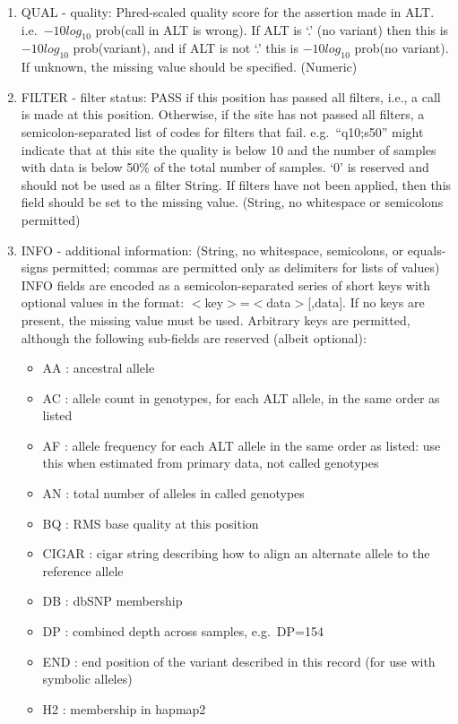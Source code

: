 \documentclass[8pt]{article}
\begin{document}
\begin{enumerate}
  \item QUAL - quality: Phred-scaled quality score for the assertion made in ALT. i.e.\ $-10log_{10}$ prob(call in ALT is wrong). If ALT is `.' (no variant) then this is $-10log_{10}$ prob(variant), and if ALT is not `.' this is $-10log_{10}$ prob(no variant). If unknown, the missing value should be specified. (Numeric)
  \item FILTER - filter status: PASS if this position has passed all filters, i.e., a call is made at this position. Otherwise, if the site has not passed all filters, a semicolon-separated list of codes for filters that fail. e.g.\ ``q10;s50'' might indicate that at this site the quality is below 10 and the number of samples with data is below 50\% of the total number of samples. `0' is reserved and should not be used as a filter String. If filters have not been applied, then this field should be set to the missing value. (String, no whitespace or semicolons permitted)
  \item INFO - additional information: (String, no whitespace, semicolons, or equals-signs permitted; commas are permitted only as delimiters for lists of values) INFO fields are encoded as a semicolon-separated series of short keys with optional values in the format: $<$key$>$=$<$data$>$[,data]. If no keys are present, the missing value must be used. Arbitrary keys are permitted, although the following sub-fields are reserved (albeit optional):
\begin{itemize}
  \item AA : ancestral allele
  \item AC : allele count in genotypes, for each ALT allele, in the same order as listed
  \item AF : allele frequency for each ALT allele in the same order as listed: use this when estimated from primary data, not called genotypes
  \item AN : total number of alleles in called genotypes
  \item BQ : RMS base quality at this position
  \item CIGAR : cigar string describing how to align an alternate allele to the reference allele
  \item DB : dbSNP membership
  \item DP : combined depth across samples, e.g.\ DP=154
  \item END : end position of the variant described in this record (for use with symbolic alleles)
  \item H2 : membership in hapmap2

\end{itemize}
\end{enumerate}
\end{document}
